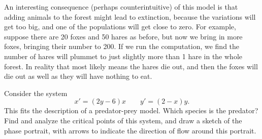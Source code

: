 \documentclass{ximera}
\begin{document}
An interesting consequence (perhaps counterintuitive) of this model is that adding animals to the forest might lead to extinction, because the variations will get too big, and one of the populations will get close to zero.  For example, suppose there are 20 foxes and 50 hares as before, but now we bring in more foxes, bringing their number to 200.  If we run the computation, we find the number of hares will plummet to just slightly more than 1 hare in the whole forest.  In reality that most likely means the hares die out, and then the foxes will die out as well as they will have nothing to eat.

\begin{example} \label{example:PredPreyNC}
    Consider the system
    \begin{equation*}
        x' = (2y - 6)x \qquad y' = (2 - x)y.
    \end{equation*}
    This fits the description of a predator-prey model. Which species is the predator? Find and analyze the critical points of this system, and draw a sketch of the phase portrait, with arrows to indicate the direction of flow around this portrait.
\end{example}
\end{document}
